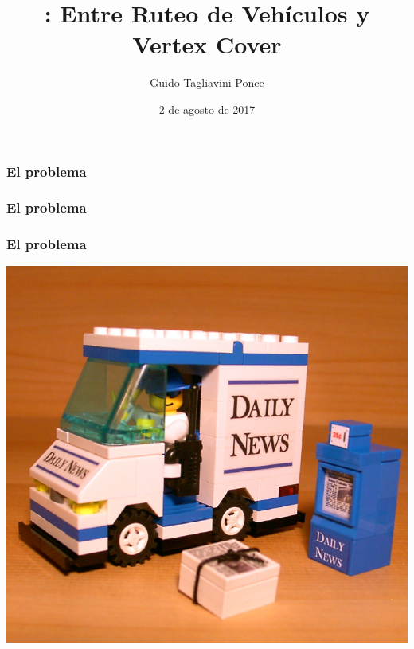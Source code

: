 \documentclass{beamer}
\title{\probl{STAR ROUTING}: Entre Ruteo de Veh\'iculos y Vertex Cover}
\author[]{Guido Tagliavini Ponce	}
\date{2 de agosto de 2017}
\begin{document}
\begin{frame}
\titlepage
\end{frame}

\begin{frame}
\frametitle{El problema}
\pause
\vspace{5mm}
\begin{figure}
	\begin{center}
		
	\end{center}	
\end{figure}
\end{frame}

\begin{frame}
\frametitle{El problema}
\vspace{5mm}
\begin{figure}
	\begin{center}
		
	\end{center}	
\end{figure}
\end{frame}

\begin{frame}
\frametitle{El problema}
\vspace{5mm}
\begin{figure}
	\begin{center}
		
	\end{center}	
\end{figure}
\begin{flushleft}
	\includegraphics[scale=0.15]{img/truck.jpg}
\end{flushleft}
\end{frame}
\end{document}
